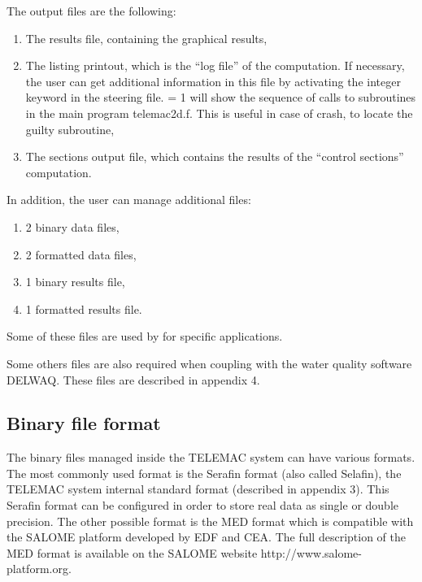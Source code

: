  The output files are the following:

\begin{enumerate}
\item  The results file, containing the graphical results,

\item  The listing printout, which is the ``log file'' of the computation. If necessary, the user can get additional information in this file by activating the integer keyword  in the steering file.  = 1 will show the sequence of calls to subroutines in the main program telemac2d.f. This is useful in case of crash, to locate the guilty subroutine,

\item  The sections output file, which contains the results of the ``control sections'' computation.
\end{enumerate}

 In addition, the user can manage additional files:

\begin{enumerate}
\item  2 binary data files,

\item  2 formatted data files,

\item  1 binary results file,

\item  1 formatted results file.
\end{enumerate}

 Some of these files are used by  for specific applications.

 Some others files are also required when coupling  with the water quality software DELWAQ. These files are described in appendix 4.


\subsection{ Binary file format}

 The binary files managed inside the TELEMAC system can have various formats. The most commonly used format is the Serafin format (also called Selafin), the TELEMAC system internal standard format (described in appendix 3). This Serafin format can be configured in order to store real data as single or double precision. The other possible format is the MED format which is compatible with the SALOME platform developed by EDF and CEA. The full description of the MED format is available on the SALOME website http://www.salome-platform.org.

